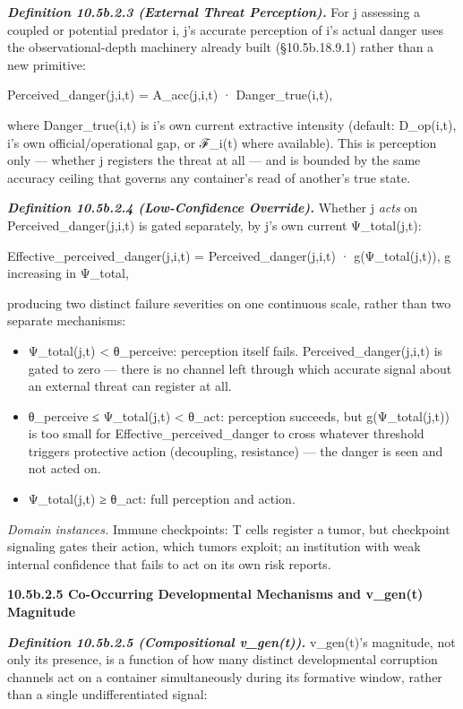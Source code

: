 \documentclass[
]{article}
\begin{document}
\emph{\textbf{Definition 10.5b.2.3 (External Threat Perception).}} For j
assessing a coupled or potential predator i, j's accurate perception of
i's actual danger uses the observational-depth machinery already built
(§10.5b.18.9.1) rather than a new primitive:

Perceived\_danger(j,i,t) = A\_acc(j,i,t) · Danger\_true(i,t),

where Danger\_true(i,t) is i's own current extractive intensity
(default: D\_op(i,t), i's own official/operational gap, or ℱ\_i(t) where
available). This is perception only --- whether j registers the threat
at all --- and is bounded by the same accuracy ceiling that governs any
container's read of another's true state.

\emph{\textbf{Definition 10.5b.2.4 (Low-Confidence Override).}} Whether
j \emph{acts} on Perceived\_danger(j,i,t) is gated separately, by j's
own current Ψ\_total(j,t):

Effective\_perceived\_danger(j,i,t) = Perceived\_danger(j,i,t) ·
g(Ψ\_total(j,t)), g increasing in Ψ\_total,

producing two distinct failure severities on one continuous scale,
rather than two separate mechanisms:

\begin{itemize}
\item
  Ψ\_total(j,t) \textless{} θ\_perceive: perception itself fails.
  Perceived\_danger(j,i,t) is gated to zero --- there is no channel left
  through which accurate signal about an external threat can register at
  all.
\item
  θ\_perceive ≤ Ψ\_total(j,t) \textless{} θ\_act: perception succeeds,
  but g(Ψ\_total(j,t)) is too small for Effective\_perceived\_danger to
  cross whatever threshold triggers protective action (decoupling,
  resistance) --- the danger is seen and not acted on.
\item
  Ψ\_total(j,t) ≥ θ\_act: full perception and action.
\end{itemize}

\emph{Domain instances.} Immune checkpoints: T cells register a tumor,
but checkpoint signaling gates their action, which tumors exploit; an
institution with weak internal confidence that fails to act on its own
risk reports.

\textbf{10.5b.2.5 Co-Occurring Developmental Mechanisms and v\_gen(t)
Magnitude}

\emph{\textbf{Definition 10.5b.2.5 (Compositional v\_gen(t)).}}
v\_gen(t)'s magnitude, not only its presence, is a function of how many
distinct developmental corruption channels act on a container
simultaneously during its formative window, rather than a single
undifferentiated signal:
\end{document}
